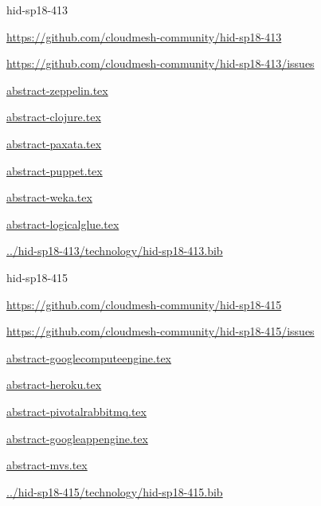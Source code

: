 \begin{IU}

hid-sp18-413

\url{https://github.com/cloudmesh-community/hid-sp18-413}

\url{https://github.com/cloudmesh-community/hid-sp18-413/issues}

\href{https://github.com/cloudmesh-community/hid-sp18-413/blob/master//technology/abstract-zeppelin.tex}{abstract-zeppelin.tex}

\href{https://github.com/cloudmesh-community/hid-sp18-413/blob/master//technology/abstract-clojure.tex}{abstract-clojure.tex}

\href{https://github.com/cloudmesh-community/hid-sp18-413/blob/master//technology/abstract-paxata.tex}{abstract-paxata.tex}

\href{https://github.com/cloudmesh-community/hid-sp18-413/blob/master//technology/abstract-puppet.tex}{abstract-puppet.tex}

\href{https://github.com/cloudmesh-community/hid-sp18-413/blob/master//technology/abstract-weka.tex}{abstract-weka.tex}

\href{https://github.com/cloudmesh-community/hid-sp18-413/blob/master//technology/abstract-logicalglue.tex}{abstract-logicalglue.tex}

\href{https://github.com/cloudmesh-community/hid-sp18-413/blob/master//technology/hid-sp18-413.bib}{../hid-sp18-413/technology/hid-sp18-413.bib}

\end{IU}


\begin{IU}

hid-sp18-415

\url{https://github.com/cloudmesh-community/hid-sp18-415}

\url{https://github.com/cloudmesh-community/hid-sp18-415/issues}

\href{https://github.com/cloudmesh-community/hid-sp18-415/blob/master//technology/abstract-googlecomputeengine.tex}{abstract-googlecomputeengine.tex}

\href{https://github.com/cloudmesh-community/hid-sp18-415/blob/master//technology/abstract-heroku.tex}{abstract-heroku.tex}

\href{https://github.com/cloudmesh-community/hid-sp18-415/blob/master//technology/abstract-pivotalrabbitmq.tex}{abstract-pivotalrabbitmq.tex}

\href{https://github.com/cloudmesh-community/hid-sp18-415/blob/master//technology/abstract-googleappengine.tex}{abstract-googleappengine.tex}

\href{https://github.com/cloudmesh-community/hid-sp18-415/blob/master//technology/abstract-mvs.tex}{abstract-mvs.tex}

\href{https://github.com/cloudmesh-community/hid-sp18-415/blob/master//technology/hid-sp18-415.bib}{../hid-sp18-415/technology/hid-sp18-415.bib}

\end{IU}


